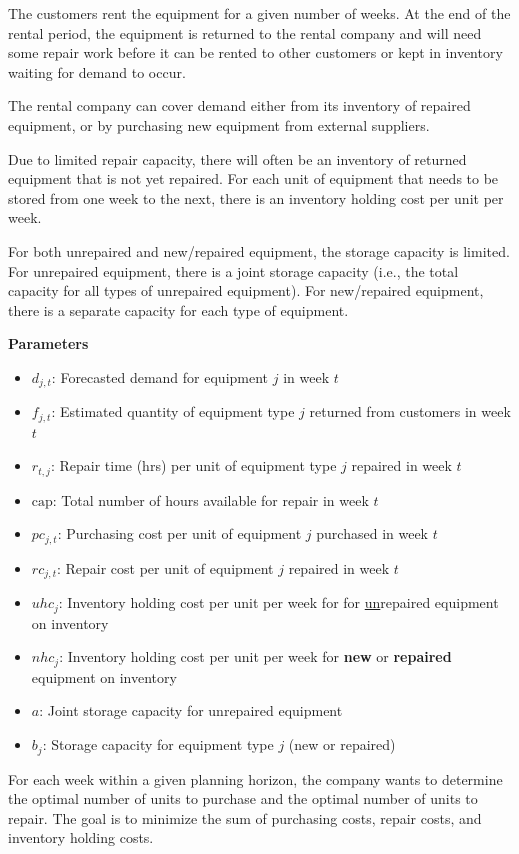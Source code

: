 \documentclass[10pt]{article}
\begin{document}
The customers rent the equipment for a given number of weeks. At the end of the rental
period, the equipment is returned to the rental company and will need some repair work
before it can be rented to other customers or kept in inventory waiting for demand to occur.

The rental company can cover demand either from its inventory of repaired equipment, or
by purchasing new equipment from external suppliers.

Due to limited repair capacity, there will often be an inventory of returned equipment that is
not yet repaired. For each unit of equipment that needs to be stored from one week to the
next, there is an inventory holding cost per unit per week.

For both unrepaired and new/repaired equipment, the storage capacity is limited. For
unrepaired equipment, there is a joint storage capacity (i.e., the total capacity for all types of
unrepaired equipment). For new/repaired equipment, there is a separate capacity for each
type of equipment.

\textbf{Parameters}
\begin{itemize}
    \item $d_{j, t} $: Forecasted demand for equipment $j $ in week $t $
    \item $f_{j, t} $: Estimated quantity of equipment type $j $ returned from customers in week $t $
    \item $r_{t, j} $: Repair time (hrs) per unit of equipment type $j $ repaired in week $t $
    \item $\text{cap} $: Total number of hours available for repair in week $t $
    \item $pc_{j, t} $: Purchasing cost per unit of equipment $j $ purchased in week $t $
    \item $rc_{j, t} $: Repair cost per unit of equipment $j $ repaired in week $t $
    \item $uhc_j $: Inventory holding cost per unit per week for for \underline{un}repaired equipment on inventory
    \item $nhc_j $: Inventory holding cost per unit per week for \textbf{new} or \textbf{repaired} equipment on inventory
    \item $a $: Joint storage capacity for unrepaired equipment
    \item $b_j $: Storage capacity for equipment type $ j $ (new or repaired)
\end{itemize}
For each week within a given planning horizon, the company wants to determine the optimal
number of units to purchase and the optimal number of units to repair. The goal is to
minimize the sum of purchasing costs, repair costs, and inventory holding costs.
\end{document}
